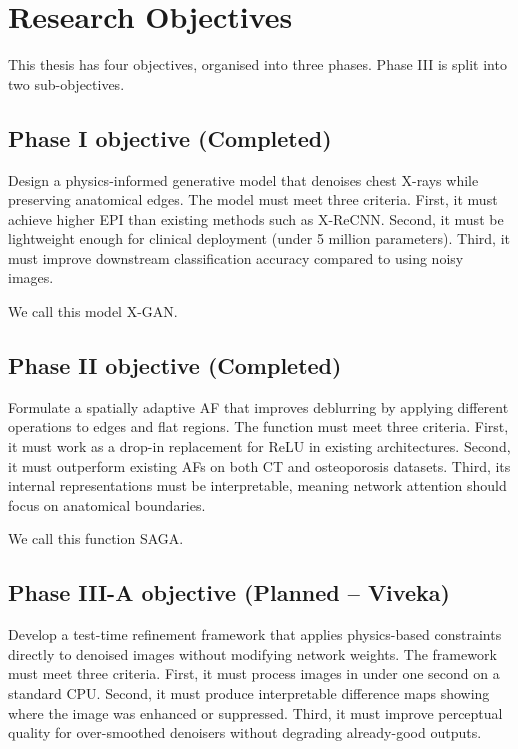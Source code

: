 
\section{Research Objectives}
\label{sec:ro}

This thesis has four objectives, organised into three phases. Phase III is split into two sub-objectives.

\subsection{Phase I objective (Completed)}

Design a physics-informed generative model that denoises chest X-rays while preserving anatomical edges. The model must meet three criteria. First, it must achieve higher EPI than existing methods such as X-ReCNN. Second, it must be lightweight enough for clinical deployment (under 5 million parameters). Third, it must improve downstream classification accuracy compared to using noisy images.

We call this model X-GAN.

\subsection{Phase II objective (Completed)}

Formulate a spatially adaptive AF that improves deblurring by applying different operations to edges and flat regions. The function must meet three criteria. First, it must work as a drop-in replacement for ReLU in existing architectures. Second, it must outperform existing AFs on both CT and osteoporosis datasets. Third, its internal representations must be interpretable, meaning network attention should focus on anatomical boundaries.

We call this function SAGA.

\subsection{Phase III-A objective (Planned – Viveka)}

Develop a test-time refinement framework that applies physics-based constraints directly to denoised images without modifying network weights. The framework must meet three criteria. First, it must process images in under one second on a standard CPU. Second, it must produce interpretable difference maps showing where the image was enhanced or suppressed. Third, it must improve perceptual quality for over-smoothed denoisers without degrading already-good outputs.

